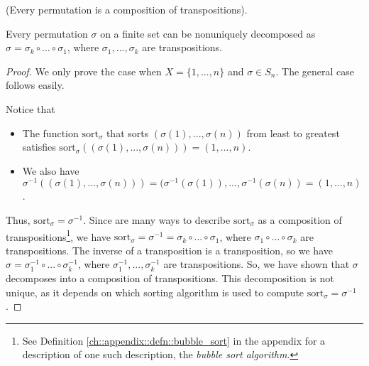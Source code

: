 \begin{theorem}
    (Every permutation is a composition of transpositions).

    Every permutation $\sigma$ on a finite set can be nonuniquely decomposed as $\sigma = \sigma_k \circ ... \circ \sigma_1$, where $\sigma_1, ..., \sigma_k$ are transpositions.
\end{theorem}

\begin{proof}
    We only prove the case when $X = \{1, ..., n\}$ and $\sigma \in S_n$. The general case follows easily.
    
    Notice that
    
    \begin{itemize}
        \item The function $\text{sort}_\sigma$ that sorts $(\sigma(1), ..., \sigma(n))$ from least to greatest satisfies $\text{sort}_\sigma((\sigma(1), ..., \sigma(n))) = (1, ..., n)$.
        \item We also have $\sigma^{-1}((\sigma(1), ..., \sigma(n))) = (\sigma^{-1}(\sigma(1)), ..., \sigma^{-1}(\sigma(n)) = (1, ..., n)$.
    \end{itemize} 
    
    Thus, $\text{sort}_\sigma = \sigma^{-1}$. Since are many ways to describe $\text{sort}_\sigma$ as a composition of transpositions\footnote{See Definition \ref{ch::appendix::defn::bubble_sort} in the appendix for a description of one such description, the \textit{bubble sort algorithm}.}, we have $\text{sort}_\sigma = \sigma^{-1} = \sigma_k \circ ... \circ \sigma_1$, where $\sigma_1 \circ ... \circ \sigma_k$ are transpositions. The inverse of a transposition is a transposition, so we have $\sigma = \sigma_1^{-1} \circ ... \circ \sigma_k^{-1}$, where $\sigma_1^{-1}, ..., \sigma_k^{-1}$ are transpositions. So, we have shown that $\sigma$ decomposes into a composition of transpositions. This decomposition is not unique, as it depends on which sorting algorithm is used to compute $\text{sort}_\sigma = \sigma^{-1}$.
    
\end{proof}

